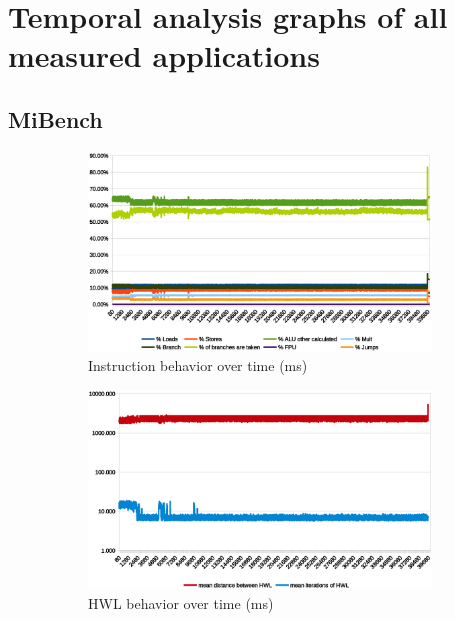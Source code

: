 \documentclass[../bachelor_paper.tex]{subfiles}
\begin{document}
\chapter{Temporal analysis graphs of all measured applications}
    \label{app:graphs}
\section{MiBench}

\begin{figure}
    \begin{subfigure}{0.45\textwidth}
        \includegraphics[width=\textwidth]{img/graph/mibench/basicmath_inst.eps}
        \caption{Instruction behavior over time (ms)}
    \end{subfigure}
    \begin{subfigure}{0.45\textwidth}
        \includegraphics[width=\textwidth]{img/graph/mibench/basicmath_hwl.eps}
        \caption{\ac{HWL} behavior over time (ms)}
    \end{subfigure}
    \begin{subfigure}{0.45\textwidth}

\end{subfigure}
\end{figure}
\end{document}
